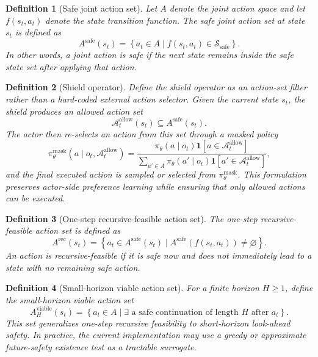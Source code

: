 \documentclass[11pt]{article}
\newtheorem{definition}{Definition}
\begin{document}
\begin{definition}[Safe joint action set]
Let $A$ denote the joint action space and let $f(s_t,a_t)$ denote the state transition function. The safe joint action set at state $s_t$ is defined as
\begin{equation}
A^{\mathrm{safe}}(s_t)
=
\left\{
a_t \in A \mid f(s_t,a_t) \in \mathcal S_{\mathrm{safe}}
\right\}.
\end{equation}
In other words, a joint action is safe if the next state remains inside the safe state set after applying that action.
\end{definition}

\begin{definition}[Shield operator]
Define the shield operator as an \emph{action-set filter} rather than a hard-coded external action selector. Given the current state $s_t$, the shield produces an allowed action set
\begin{equation}
\mathcal A_t^{\mathrm{allow}}(s_t) \subseteq A^{\mathrm{safe}}(s_t).
\end{equation}
The actor then re-selects an action from this set through a masked policy
\begin{equation}
\pi_\theta^{\mathrm{mask}}(a \mid o_t,\mathcal A_t^{\mathrm{allow}})
=
\frac{\pi_\theta(a\mid o_t)\mathbf 1[a\in \mathcal A_t^{\mathrm{allow}}]}
{\sum_{a' \in A}\pi_\theta(a'\mid o_t)\mathbf 1[a'\in \mathcal A_t^{\mathrm{allow}}]},
\end{equation}
and the final executed action is sampled or selected from $\pi_\theta^{\mathrm{mask}}$. This formulation preserves actor-side preference learning while ensuring that only allowed actions can be executed.
\end{definition}

\begin{definition}[One-step recursive-feasible action set]
The one-step recursive-feasible action set is defined as
\begin{equation}
A^{\mathrm{rec}}(s_t)
=
\left\{
 a_t \in A^{\mathrm{safe}}(s_t)
 \mid
 A^{\mathrm{safe}}(f(s_t,a_t)) \neq \varnothing
\right\}.
\end{equation}
An action is recursive-feasible if it is safe now and does not immediately lead to a state with no remaining safe action.
\end{definition}

\begin{definition}[Small-horizon viable action set]
For a finite horizon $H \ge 1$, define the small-horizon viable action set
\begin{equation}
A_H^{\mathrm{viable}}(s_t)
=
\left\{
 a_t \in A
 \mid
 \exists \text{ a safe continuation of length } H \text{ after } a_t
\right\}.
\end{equation}
This set generalizes one-step recursive feasibility to short-horizon look-ahead safety. In practice, the current implementation may use a greedy or approximate future-safety existence test as a tractable surrogate.
\end{definition}
\end{document}

